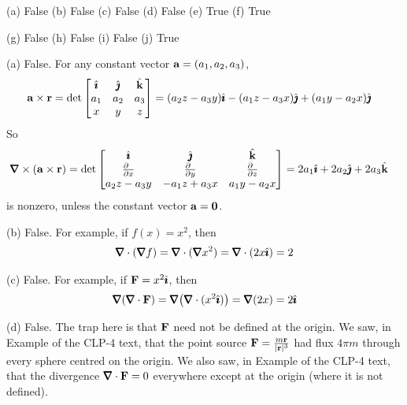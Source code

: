 \begin{answer} 
(a) False\qquad
(b) False\qquad
(c) False\qquad
(d) False\qquad
(e) True\qquad
(f) True

(g) False\qquad
(h) False\qquad
(i) False\qquad
(j) True
\end{answer}

\begin{solution} (a)
False.
For any constant vector $\mathbf{a}=(a_1,a_2,a_3)$,
\begin{align*}
\mathbf{a}\times\mathbf{r}
&=\det\left[\begin{matrix}
\hat{\pmb{\imath}} &\hat{\pmb{\jmath}} &\hat{\mathbf{k}} \\
a_1 & a_2 & a_3 \\
x   &  y  & z
\end{matrix}
\right]
= (a_2 z - a_3 y)\hat{\pmb{\imath}} 
 -(a_1 z - a_3 x)\hat{\pmb{\jmath}}
 +(a_1 y - a_2 x)\hat{\pmb{\jmath}}
\end{align*}
So 
\begin{align*}
\vnabla\times(\va\times\vr)
&=\det\left[\begin{matrix}
\hi &\hj &\hk \\
\tfrac{\partial\hfill}{\partial x} & \tfrac{\partial\hfill}{\partial y} & 
                \tfrac{\partial\hfill}{\partial z} \\
a_2 z - a_3 y & -a_1 z + a_3 x & a_1 y - a_2 x
\end{matrix}
\right]
=2 a_1\hi + 2 a_2\hj + 2 a_3\hk 
\end{align*}
is nonzero, unless the constant vector $\mathbf{a}=\mathbf{0}$.

\noindent (b)
False. For example, if $f(x) = x^2$, then
\begin{align*}
\vnabla\cdot(\vnabla f)
=\vnabla\cdot(\vnabla x^2)
=\vnabla\cdot(2x\hi)
=2
\end{align*}

\noindent (c)
False. For example, if $\mathbf{F} = x^2\hat{\pmb{\imath}}$, then
\begin{align*}
\vnabla(\vnabla\cdot\vF)
=\vnabla\big(\vnabla\cdot(x^2\hi)\big)
=\vnabla(2x)
=2\hi
\end{align*}

\noindent (d)
False. The trap here is that $\mathbf{F}$ need not be defined
at the origin. We saw, in Example  of the CLP-4
text, that the point source $\mathbf{F}=\frac{m\mathbf{r}}{|\mathbf{r}|^3}$ had flux 
$4\pi m$ through every sphere centred on the  origin. We also saw,
in Example  of the CLP-4 text, that the divergence
$\vnabla\cdot\vF=0$ everywhere except at the origin (where it is not defined).



\end{solution}
